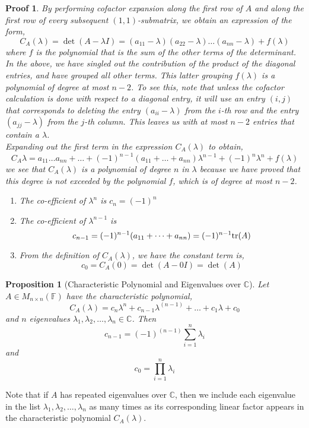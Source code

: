 \documentclass[10pt]{article}
\theoremstyle{break}
\newtheorem*{pf}{Proof}
\newtheorem{prop}[thm]{Proposition}
\begin{document}
\begin{pf}
  By performing cofactor expansion along the first row of $A$ and along the first row of every subsequent $(1, 1)$-submatrix, we obtain an expression of the form, 
  $$C_A(\lambda) = \det(A - \lambda I) = (a_{11} - \lambda)(a_{22} - \lambda) \dots (a_{nn} - \lambda) + f(\lambda)$$
  where $f$ is the polynomial that is the sum of the other terms of the determinant. In the above, we have singled out the contribution of the product of the diagonal entries, and have grouped all other terms. This latter grouping $f (\lambda)$ is a polynomial of degree at most $n - 2$. To see this, note that unless the cofactor calculation is done with respect to a diagonal entry, it will use an entry $(i, j)$ that corresponds to deleting the entry $(a_{ii} - \lambda)$ from the $i$-th row and the entry $(a_{jj} - \lambda)$ from the $j$-th column. This leaves us with at most $n - 2$  entries that contain a $\lambda$.
  \\ 
  Expanding out the first term in the expression $C_A(\lambda)$ to obtain,
  $$C_A{\lambda} = a_{11} \dots a_{nn} + \dots + (-1)^{n - 1}(a_{11} + \dots + a_{nn})\lambda^{n - 1} + (-1)^n\lambda ^n + f(\lambda)$$
  we see that $C_A(\lambda)$ is a polynomial of degree $n$ in $\lambda$ because we have proved that this degree is not exceeded by the polynomial $f$, which is of degree at most $n - 2$.
  \begin{enumerate}
    \item The co-efficient of $\lambda^n$ is $c_n = (-1)^n$
    \item The co-efficient of $\lambda ^{n-1}$ is $$c_{n-1} = (-1)^{n -1} (a_{11} + \dots + a_{nn}) = (-1)^{n-1}\space \text{tr}(A)$$
    \item From the definition of $C_A({\lambda})$, we have the constant term is, $$c_0 = C_A(0) = \det(A - 0 I) = \det(A)$$
  \end{enumerate}
\end{pf}
\begin{prop}[Characteristic Polynomial and Eigenvalues over $\mathbb{C}$]
  Let $A \in M_{n \times n}(\mathbb{F})$ have the characteristic polynomial, $$C_A(\lambda) = c_n\lambda^n + c_{n-1}\lambda^{(n-1)} + \dots + c_1\lambda + c_0$$
  and $n$ eigenvalues $\lambda_1, \lambda_2, \dots, \lambda_n \in \mathbb{C}$. Then $$c_{n - 1} = (-1)^{(n-1)} \sum^{n}_{i = 1}\lambda_i$$ and $$c_0 = \prod^n_{i = 1}\lambda_i$$
\end{prop}
Note that if $A$ has repeated eigenvalues over $\mathbb{C}$, then we include each eigenvalue in the list $\lambda_1, \lambda_2, \dots, \lambda_n$ as many times as its corresponding linear factor appears in the characteristic polynomial $C_A(\lambda)$.
\end{document}
